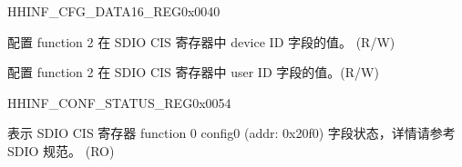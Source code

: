 \begin{register}{H}{HINF\_CFG\_DATA16\_REG}{0x0040}\label{regdesc:HINFCFGDATA16REG}
%
%
\regnewline%
\begin{regdesc}\begin{reglist}
\label{fielddesc:HINFDEVICEIDFN2}\item [HINF\_DEVICE\_ID\_FN2] 配置 function 2 在 SDIO CIS 寄存器中 device ID 字段的值。 (R/W)
\label{fielddesc:HINFUSERIDFN2}\item [HINF\_USER\_ID\_FN2] 配置 function 2 在 SDIO CIS 寄存器中 user ID 字段的值。(R/W)
\end{reglist}\end{regdesc}
\end{register}


\begin{register}{H}{HINF\_CONF\_STATUS\_REG}{0x0054}\label{regdesc:HINFCONFSTATUSREG}
%
%
\regnewline%
\begin{regdesc}\begin{reglist}
\label{fielddesc:HINFFUNC0CONFIG0}\item [HINF\_FUNC0\_CONFIG0] 表示 SDIO CIS 寄存器 function 0 config0 (addr: 0x20f0) 字段状态，详情请参考 SDIO 规范。 (RO)
\end{reglist}\end{regdesc}
\end{register}

